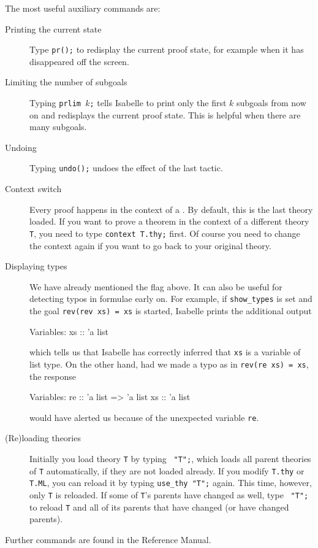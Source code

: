 The most useful auxiliary commands are:
\begin{description}
\item[Printing the current state]
Type \texttt{pr();} to redisplay the current proof state, for example when it
has disappeared off the screen.
\item[Limiting the number of subgoals]
Typing \texttt{prlim $k$;} tells Isabelle to print only the first $k$
subgoals from now on and redisplays the current proof state. This is helpful
when there are many subgoals.
\item[Undoing] Typing \texttt{undo();} undoes the effect of the last
tactic.
\item[Context switch] Every proof happens in the context of a
  . By default, this is the last theory loaded. If
  you want to prove a theorem in the context of a different theory
  \texttt{T}, you need to type \texttt{context T.thy;}
  first. Of course you need to change the context again if you want to go
  back to your original theory.
\item[Displaying types] We have already mentioned the flag
   above. It can also be useful for detecting typos in
  formulae early on. For example, if \texttt{show_types} is set and the goal
  \texttt{rev(rev xs) = xs} is started, Isabelle prints the additional output
\begin{ttbox}
{\out Variables:}
{\out   xs :: 'a list}
\end{ttbox}
which tells us that Isabelle has correctly inferred that
\texttt{xs} is a variable of list type. On the other hand, had we
made a typo as in \texttt{rev(re xs) = xs}, the response
\begin{ttbox}
Variables:
  re :: 'a list => 'a list
  xs :: 'a list
\end{ttbox}
would have alerted us because of the unexpected variable \texttt{re}.
\item[(Re)loading theories]
Initially you load theory \texttt{T} by typing ~\texttt{"T";},
which loads all parent theories of \texttt{T} automatically, if they are not
loaded already. If you modify \texttt{T.thy} or \texttt{T.ML}, you can
reload it by typing \texttt{use_thy~"T";} again. This time, however, only
\texttt{T} is reloaded. If some of \texttt{T}'s parents have changed as well,
type ~\texttt{"T";} to reload \texttt{T} and all of
its parents that have changed (or have changed parents).
\end{description}
Further commands are found in the Reference Manual.


